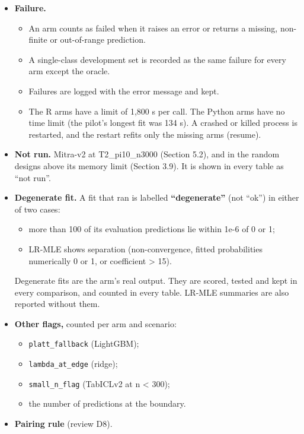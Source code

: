 \documentclass[
  10pt,
]{article}
\providecommand{\tightlist}{%
  \setlength{\itemsep}{0pt}\setlength{\parskip}{0pt}}
\begin{document}
\begin{itemize}
\tightlist
\item
  \textbf{Failure.}

  \begin{itemize}
  \tightlist
  \item
    An arm counts as failed when it raises an error or
    returns a missing, non-finite or out-of-range
    prediction.
  \item
    A single-class development set is recorded as the same
    failure for every arm except the oracle.
  \item
    Failures are logged with the error message and kept.
  \item
    The R arms have a limit of 1,800 s per call. The Python
    arms have no time limit (the pilot's longest fit was 134
    s). A crashed or killed process is restarted, and the
    restart refits only the missing arms (resume).
  \end{itemize}
\item
  \textbf{Not run.} Mitra-v2 at T2\_pi10\_n3000 (Section
  5.2), and in the random designs above its memory limit
  (Section 3.9). It is shown in every table as ``not run''.
\item
  \textbf{Degenerate fit.} A fit that ran is labelled
  \textbf{``degenerate''} (not ``ok'') in either of two
  cases:

  \begin{itemize}
  \tightlist
  \item
    more than 100 of its evaluation predictions lie within
    1e-6 of 0 or 1;
  \item
    LR-MLE shows separation (non-convergence, fitted
    probabilities numerically 0 or 1, or
    \textbar coefficient\textbar{} \textgreater{} 15).
  \end{itemize}

  Degenerate fits are the arm's real output. They are
  scored, tested and kept in every comparison, and counted
  in every table. LR-MLE summaries are also reported without
  them.
\item
  \textbf{Other flags,} counted per arm and scenario:

  \begin{itemize}
  \tightlist
  \item
    \texttt{platt\_fallback} (LightGBM);
  \item
    \texttt{lambda\_at\_edge} (ridge);
  \item
    \texttt{small\_n\_flag} (TabICLv2 at n \textless{} 300);
  \item
    the number of predictions at the boundary.
  \end{itemize}
\item
  \textbf{Pairing rule} (review D8).


\end{itemize}
\end{document}
